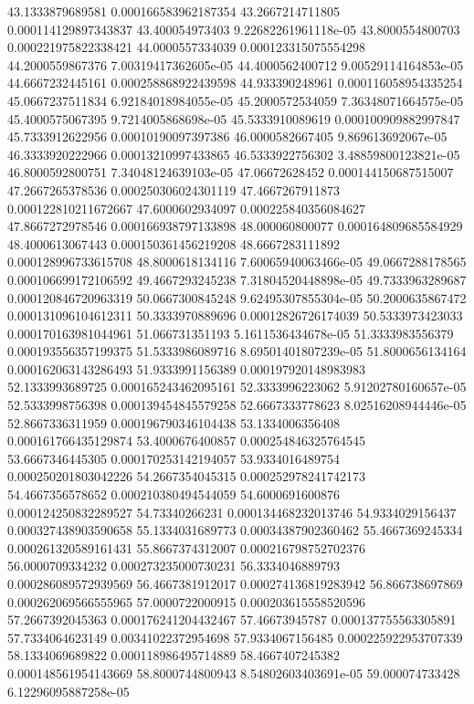 {43.1333879689581 0.000166583962187354
43.2667214711805 0.000114129897343837
43.400054973403 9.22682261961118e-05
43.8000554800703 0.000221975822338421
44.0000557334039 0.000123315075554298
44.2000559867376 7.00319417362605e-05
44.4000562400712 9.00529114164853e-05
44.6667232445161 0.000258868922439598
44.933390248961 0.000116058954335254
45.0667237511834 6.92184018984055e-05
45.2000572534059 7.36348071664575e-05
45.4000575067395 9.7214005868698e-05
45.5333910089619 0.000100909882997847
45.7333912622956 0.00010190097397386
46.0000582667405 9.869613692067e-05
46.3333920222966 0.00013210997433865
46.5333922756302 3.48859800123821e-05
46.8000592800751 7.34048124639103e-05
47.06672628452 0.000144150687515007
47.2667265378536 0.000250306024301119
47.4667267911873 0.000122810211672667
47.6000602934097 0.000225840356084627
47.8667272978546 0.000166938797133898
48.000060800077 0.000164809685584929
48.4000613067443 0.000150361456219208
48.6667283111892 0.000128996733615708
48.8000618134116 7.60065940063466e-05
49.0667288178565 0.000106699172106592
49.4667293245238 7.31804520448898e-05
49.7333963289687 0.000120846720963319
50.0667300845248 9.62495307855304e-05
50.2000635867472 0.000131096104612311
50.3333970889696 0.00012826726174039
50.5333973423033 0.000170163981044961
51.066731351193 5.1611536434678e-05
51.3333983556379 0.000193556357199375
51.5333986089716 8.69501401807239e-05
51.8000656134164 0.000162063143286493
51.9333991156389 0.000197920148983983
52.1333993689725 0.000165243462095161
52.3333996223062 5.91202780160657e-05
52.5333998756398 0.000139454845579258
52.6667333778623 8.02516208944446e-05
52.8667336311959 0.000196790346104438
53.1334006356408 0.000161766435129874
53.4000676400857 0.000254846325764545
53.6667346445305 0.000170253142194057
53.9334016489754 0.000250201803042226
54.2667354045315 0.000252978241742173
54.4667356578652 0.000210380494544059
54.6000691600876 0.000124250832289527
54.73340266231 0.000134468232013746
54.9334029156437 0.000327438903590658
55.1334031689773 0.00034387902360462
55.4667369245334 0.000261320589161431
55.8667374312007 0.000216798752702376
56.0000709334232 0.000273235000730231
56.3334046889793 0.000286089572939569
56.4667381912017 0.000274136819283942
56.866738697869 0.000262069566555965
57.0000722000915 0.000203615558520596
57.2667392045363 0.000176241204432467
57.46673945787 0.000137755563305891
57.7334064623149 0.00341022372954698
57.9334067156485 0.000225922953707339
58.1334069689822 0.000118986495714889
58.4667407245382 0.000148561954143669
58.8000744800943 8.54802603403691e-05
59.000074733428 6.12296095887258e-05
}
